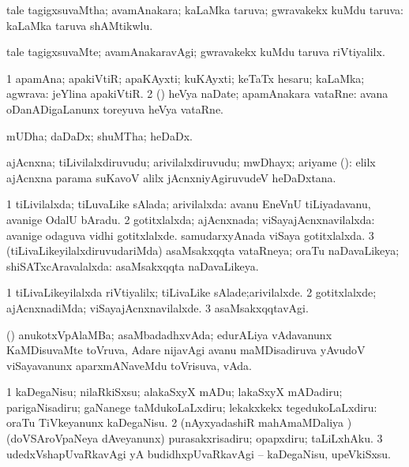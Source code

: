 \bentry
{}
\gl{\gu}
\bmng
tale tagigxsuvaMtha; avamAnakara; kaLaMka taruva; gwravakekx kuMdu taruva:  kaLaMka taruva shAMtikwlu. 
\emng
\eentry

\bentry
{}
\gl{\kirxvi}
\bmng
tale tagigxsuvaMte; avamAnakaravAgi; gwravakekx kuMdu taruva riVtiyalilx. 
\emng
\eentry

\bentry
{}
\gl{\nA}
\bmng
\bnum
\num{1} apamAna; apakiVtiR; apaKAyxti; kuKAyxti; keTaTx hesaru; kaLaMka; agwrava:  jeYlina apakiVtiR. 
\num{2} (\pArxparx) heVya naDate; apamAnakara vataRne:  avana oDanADigaLanunx toreyuva heVya vataRne. 
\enum
\emng
\eentry

\bentry
{}
\gl{\nA}
\bmng
mUDha; daDaDx; shuMTha; heDaDx. 
\emng
\eentry

\bentry
{}
\gl{\nA}
\bmng
ajAcnxna; tiLivilalxdiruvudu; arivilalxdiruvudu; mwDhayx; ariyame (\gArxM):  elilx ajAcnxna parama suKavoV alilx jAcnxniyAgiruvudeV heDaDxtana. 
\emng
\eentry

\bentry
{}
\gl{\gu}
\bmng
\bnum
\num{1} tiLivilalxda; tiLuvaLike sAlada; arivilalxda:  avanu EneVnU tiLiyadavanu, avanige OdalU bAradu. 
\num{2} gotitxlalxda; ajAcnxnada; viSayajAcnxnavilalxda:  avanige odaguva vidhi gotitxlalxde.  samudarxyAnada viSaya gotitxlalxda. 
\num{3} (tiLivaLikeyilalxdiruvudariMda) asaMsakxqqta vataRneya; oraTu naDavaLikeya; shiSATxcAravalalxda:  asaMsakxqqta naDavaLikeya. 
\enum
\emng
\eentry

\bentry
{}
\gl{\kirxvi}
\bmng
\bnum
\num{1} tiLivaLikeyilalxda riVtiyalilx; tiLivaLike sAlade;arivilalxde. 
\num{2} gotitxlalxde; ajAcnxnadiMda; viSayajAcnxnavilalxde. 
\num{3} asaMsakxqqtavAgi. 
\enum
\emng
\eentry

\bentry
{}
\gl{\nA}
\expl{\Latin}
\bmng
(\takaR) anukotxVpAlaMBa; asaMbadadhxvAda; edurALiya vAdavanunx KaMDisuvaMte toVruva, Adare nijavAgi avanu maMDisadiruva yAvudoV viSayavanunx aparxmANaveMdu toVrisuva, vAda. 
\emng
\eentry

\bentry
{}
\gl{\sakirx}
\bmng
\bnum
\num{1} kaDegaNisu; nilaRkiSxsu; alakaSxyX mADu; lakaSxyX mADadiru; parigaNisadiru; gaNanege taMdukoLaLxdiru; lekakxkekx tegedukoLaLxdiru:  oraTu TiVkeyanunx kaDegaNisu. 
\num{2} (nAyxyadashiR mahAmaMDaliya \vi) (doVSAroVpaNeya dAveyanunx) purasakxrisadiru; opapxdiru; taLiLxhAku. 
\num{3} udedxVshapUvaRkavAgi yA budidhxpUvaRkavAgi -- kaDegaNisu, upeVkiSxsu. 
\enum
\emng
\eentry

